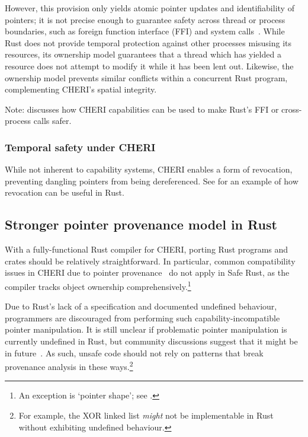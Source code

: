 \documentclass[dissertation.tex]{subfiles}
\begin{document}
However, this provision only yields atomic pointer updates and
identifiability of pointers;
it is not precise enough to guarantee safety across thread or process
boundaries, such as foreign function interface (FFI) and system
calls~\cite{cheri-2019-abstract}.
While Rust does not provide temporal protection against other processes
misusing its resources, its ownership model guarantees that a thread
which has yielded a resource does not attempt to modify it while it has
been lent out.
Likewise, the ownership model prevents similar conflicts within a
concurrent Rust program, complementing CHERI's spatial integrity.

Note:  discusses how CHERI capabilities can
be used to make Rust's FFI or cross-process calls safer.

\subsubsection{Temporal safety under CHERI}
While not inherent to capability systems, CHERI enables a form of
revocation, preventing dangling pointers from being dereferenced.
See  for an example of how revocation
can be useful in Rust.


\subsection{Stronger pointer provenance model in Rust}
\label{sec:eval-cheri-provenance}

With a fully-functional Rust compiler for CHERI, porting Rust programs
and crates should be relatively straightforward.
In particular, common compatibility issues in CHERI due to pointer
provenance~\cite{cheri-2019-abstract} do not apply in Safe Rust,
as the compiler tracks object ownership comprehensively.\footnote{
An exception is `pointer shape'; see .
}

Due to Rust's lack of a specification and documented undefined
behaviour, programmers are discouraged from performing such
capability-incompatible pointer manipulation.
It is still unclear if problematic pointer manipulation is currently
undefined in Rust, but community discussions suggest that it might be in
future~\cite{rust-ucg-provenance}.
As such, unsafe code should not rely on patterns that break provenance
analysis in these ways.\footnote{
For example, the XOR linked list \emph{might} not be implementable
in Rust without exhibiting undefined behaviour.
}
\end{document}

